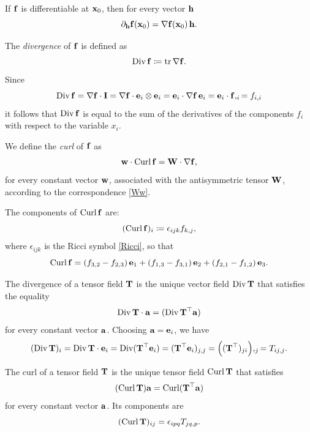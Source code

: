 If $\mathbf{f}$ is differentiable at $\mathbf{x}_0$, then for every vector $\mathbf{h}$
\begin{equation}
	\partial_{\mathbf{h}}\mathbf{f} (\mathbf{x}_0)=\nabla\mathbf{f} (\mathbf{x}_0)\, \mathbf{h}.
\end{equation}

The \textit{divergence} of $\mathbf{f}$ is defined as
\begin{equation}
	\operatorname{Div} \mathbf{f} \coloneqq \operatorname{tr}\nabla \mathbf{f}.
\end{equation}
Since
\begin{equation}
	\operatorname{Div} \mathbf{f}=\nabla\mathbf{f} \cdot \mathbf{I} =\nabla \mathbf{f} \cdot \mathbf{e}_i \otimes \mathbf{e}_i =\mathbf{e}_i \cdot \nabla \mathbf{f} \,\mathbf{e}_i =\mathbf{e}_i\cdot \mathbf{f},_i= f_{i,i}
\end{equation}
it follows that $\operatorname{Div} \mathbf{f}$ is equal to the sum of the derivatives of the components $f_i$ with respect to the variable $x_i$.

We define the \textit{curl} of $\mathbf{f}$ as
\begin{equation}
	\mathbf{w} \cdot \operatorname{Curl} \mathbf{f} = \mathbf{W} \cdot \nabla \mathbf{f},
\end{equation}
for every constant vector $\mathbf{w}$, associated with the antisymmetric tensor $\mathbf{W}$, according to the correspondence \eqref{Ww}.

The components of $\operatorname{Curl} \mathbf{f}$ are:
\begin{equation}
	(\operatorname{Curl} \mathbf{f})_i\coloneqq\epsilon_{ijk}f_{k,j},
\end{equation}
where $\epsilon_{ijk}$ is the Ricci symbol \eqref{Ricci}, so that
\begin{equation}
	\operatorname{Curl} \mathbf{f}=(f_{3,2}-f_{2,3})\,\mathbf{e}_{1}+(f_{1,3}-f_{3,1})\,\mathbf{e}_2 + (f_{2,1}-f_{1,2})\,\mathbf{e}_3.
\end{equation}

The divergence of a tensor field $\mathbf{T}$ is the unique vector field $\operatorname{Div} \mathbf{T}$ that satisfies the equality
\begin{equation}
	\operatorname{Div} \mathbf{T} \cdot \mathbf{a} =(\operatorname{Div} \mathbf{T} ^\top \mathbf{a})
\end{equation}
for every constant vector $\mathbf{a}$. Choosing $\mathbf{a} = \mathbf{e}_i$, we have
\begin{equation}
	(\operatorname{Div} \mathbf{T})_i=\operatorname{Div} \mathbf{T} \cdot\mathbf{e}_i =\operatorname{Div} (\mathbf{T}^\top \mathbf{e}_i)=(\mathbf{T}^\top \mathbf{e}_i)_{j,j}=\Big((\mathbf{T} ^\top)_{ji}\Big),_{j}=T_{ij,j}.
\end{equation}

The curl of a tensor field $\mathbf{T}$ is the unique tensor field $\operatorname{Curl} \mathbf{T}$ that satisfies
\begin{equation}\label{RotT}
	(\operatorname{Curl} \mathbf{T}) \mathbf{a} =\operatorname{Curl} (\mathbf{T} ^\top \mathbf{a})
\end{equation} 
for every constant vector $\mathbf{a}$. Its components are
\begin{equation}
	(\operatorname{Curl} \mathbf{T})_{ij}=\epsilon_{ipq}T_{jq,p}.
\end{equation}


